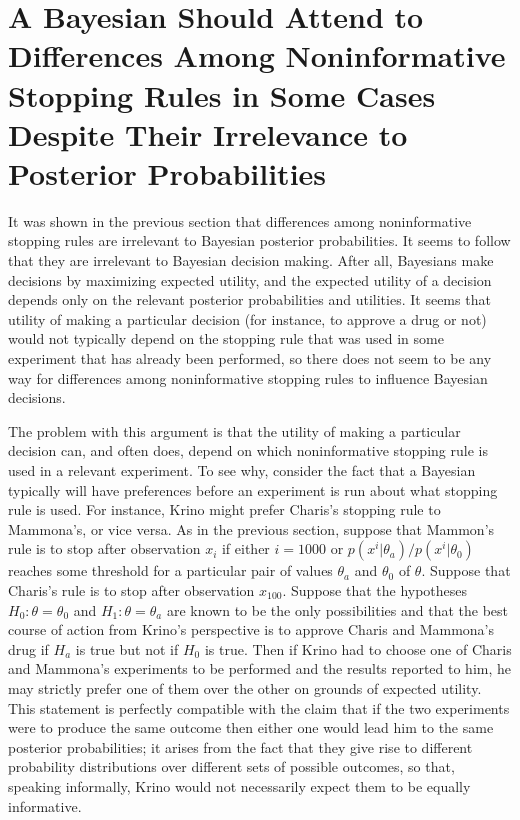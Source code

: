 \documentclass{article}
\theoremstyle{definition}
\begin{document}
\section{A Bayesian Should Attend to Differences Among Noninformative Stopping Rules in Some Cases Despite Their Irrelevance to Posterior Probabilities}\label{sec:stop}

It was shown in the previous section that differences among noninformative stopping rules are irrelevant to Bayesian posterior probabilities.
It seems to follow that they are irrelevant to Bayesian decision making.
After all, Bayesians make decisions by maximizing expected utility, and the expected utility of a decision depends only on the relevant posterior probabilities and utilities.
It seems that utility of making a particular decision (for instance, to approve a drug or not) would not typically depend on the stopping rule that was used in some experiment that has already been performed, so there does not seem to be any way for differences among noninformative stopping rules to influence Bayesian decisions.

The problem with this argument is that the utility of making a particular decision can, and often does, depend on which noninformative stopping rule is used in a relevant experiment.
To see why, consider the fact that a Bayesian typically will have preferences before an experiment is run about what stopping rule is used.
For instance, Krino might prefer Charis's stopping rule to Mammona's, or vice versa.
As in the previous section, suppose that Mammon's rule is to stop after observation $x_i$ if either $i=1000$ or $p(x^i|\theta_a)/p(x^i|\theta_0)$ reaches some threshold for a particular pair of values $\theta_a$ and $\theta_0$ of $\theta$.
Suppose that Charis's rule is to stop after observation $x_{100}$.
Suppose that the hypotheses $H_0:\theta=\theta_0$ and $H_1:\theta=\theta_a$ are known to be the only possibilities and that the best course of action from Krino's perspective is to approve Charis and Mammona's drug if $H_a$ is true but not if $H_0$ is true.
Then if Krino had to choose one of Charis and Mammona's experiments to be performed and the results reported to him, he may strictly prefer one of them over the other on grounds of expected utility.
This statement is perfectly compatible with the claim that if the two experiments were to produce the same outcome then either one would lead him to the same posterior probabilities; it arises from the fact that they give rise to different probability distributions over different sets of possible outcomes, so that, speaking informally, Krino would not necessarily expect them to be equally informative.
\end{document}
